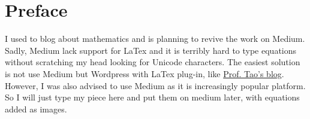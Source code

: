 \chapter{Preface}
I used to blog about mathematics and is planning to revive the work on Medium. Sadly, Medium lack support for LaTex and it is terribly hard to type equations without scratching my head looking for Unicode characters. The easiest solution is not use Medium but Wordpress with LaTex plug-in, like \href{https://terrytao.wordpress.com/}{Prof. Tao's blog}. However, I was also advised to use Medium as it is increasingly popular platform. So I will just type my piece here and put them on medium later, with equations added as images.